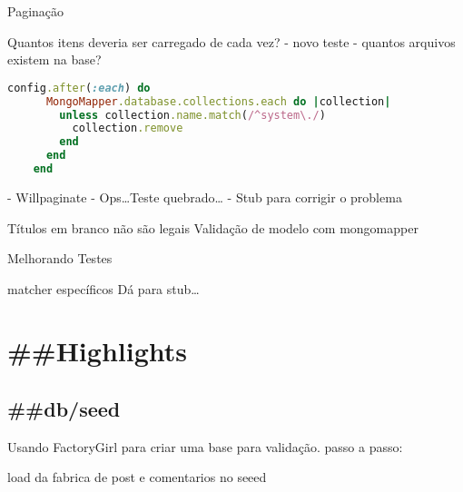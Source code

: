\documentclass[serif,mathserif]{article}
\begin{document}
Paginação

Quantos itens deveria ser carregado de cada vez?
- novo teste
- quantos arquivos existem na base?
\begin{lstlisting}[language=ruby]
    config.after(:each) do
      MongoMapper.database.collections.each do |collection|
        unless collection.name.match(/^system\./)
          collection.remove
        end
      end
    end
\end{lstlisting}

- Willpaginate
- Ops\ldots Teste quebrado\ldots
- Stub para corrigir o problema



Títulos em branco não são legais
Validação de modelo com mongomapper


Melhorando Testes

matcher específicos
Dá para stub\ldots 






\section{\#\#Highlights}

\subsection{\#\#db/seed}

Usando FactoryGirl para criar uma base para validação.
passo a passo:

load da fabrica de post e comentarios no seeed




% 
\end{document}
